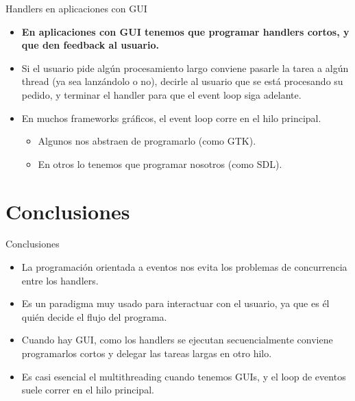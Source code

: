 \begin{frame}{Handlers en aplicaciones con GUI}{
}

  \begin{itemize}

    \item \textbf{En aplicaciones con GUI tenemos que programar handlers cortos, y que den feedback al usuario.}

    \item Si el usuario pide alg\'un procesamiento largo conviene pasarle la tarea a alg\'un thread (ya sea lanz\'andolo o no), decirle al usuario que se est\'a procesando su pedido, y terminar el handler para que el event loop siga adelante.

    \item En muchos frameworks gr\'aficos, el event loop corre en el hilo principal.
    \begin{itemize}
      \item Algunos nos abstraen de programarlo (como GTK).
      \item En otros lo tenemos que programar nosotros (como SDL).      
    \end{itemize}

  \end{itemize}

\end{frame}


\section{Conclusiones}

\begin{frame}{Conclusiones}{
}

  \begin{itemize}

    \item La programaci\'on orientada a eventos nos evita los problemas de concurrencia entre los handlers.

    \item Es un paradigma muy usado para interactuar con el usuario, ya que es \'el qui\'en decide el flujo del programa.

    \item Cuando hay GUI, como los handlers se ejecutan secuencialmente conviene programarlos cortos y delegar las tareas largas en otro hilo.

    \item Es casi esencial el multithreading cuando tenemos GUIs, y el loop de eventos suele correr en el hilo principal.

  \end{itemize}

\end{frame}


